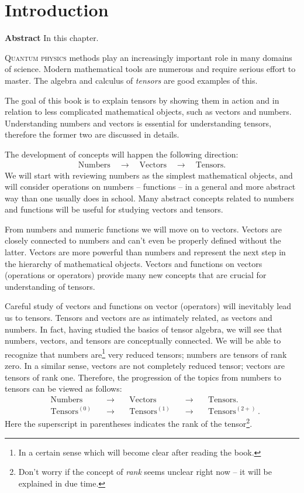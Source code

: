 \chapter{Introduction}\label{ch:Introduction}
{\bf Abstract}\hspace{0.2cm} In this chapter.


\lettrine[lines=2]{\color{darkocre}Q}{uantum physics} methods play an
increasingly important role in many
domains of science. Modern mathematical tools are numerous and require
serious effort to master. The algebra and calculus of \emph{tensors}
are good examples of this.

The goal of this book is to explain tensors by
showing them in action and in relation to less complicated
mathematical objects, such as vectors and numbers. Understanding
numbers and vectors is
essential for understanding tensors, therefore the former two are
discussed in details.

The development of concepts will happen the following direction:
\begin{align*}
\textrm{Numbers}\quad\rightarrow\quad\textrm{Vectors}\quad\rightarrow\quad\textrm{Tensors.}
\end{align*}
We will start with reviewing numbers as the simplest mathematical
objects, and will consider operations on numbers -- functions -- in a
general and more abstract way than one usually does in school. Many
abstract concepts related to numbers and functions will be useful for
studying vectors and tensors.

From numbers and numeric functions we will move on to vectors. Vectors
are closely connected to numbers and can't even be properly defined
without the latter. Vectors are more powerful
than numbers and represent the next step in the hierarchy of
mathematical objects. Vectors and functions on vectors (operations or
operators) provide many new concepts that are crucial for
understanding of tensors.

Careful study of vectors and functions on vector (operators)
will inevitably lead us to tensors. Tensors and vectors are as
intimately related, as vectors and numbers. In fact, having studied
the basics of tensor algebra, we will see that numbers, vectors, and
tensors are conceptually connected. We will be able to recognize that
numbers are\footnote{In a certain sense which will become clear
after reading the book.} very reduced tensors; numbers are tensors of
 rank zero. In a similar sense, vectors are not completely reduced
 tensor; vectors
are tensors of rank one. Therefore, the progression of the topics from
numbers to tensors can be viewed as follows:
\begin{align*}
  & \textrm{Numbers} \quad & \rightarrow \quad & \textrm{Vectors} \quad &
  \rightarrow \quad & \textrm{Tensors.}\\
  & \textrm{Tensors}^{(0)} \quad & \rightarrow  \quad & \textrm{Tensors}^{(1)}
  \quad & \rightarrow \quad & \textrm{Tensors}^{(2+)}\,.
\end{align*}
Here the superscript in parentheses indicates the rank of the
tensor\footnote{Don't worry if the concept of \emph{rank} seems
unclear right now -- it will be explained in due time.}.


